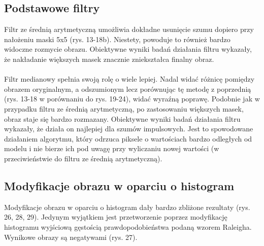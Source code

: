 \documentclass{classrep}
\begin{document}
\subsection{Podstawowe filtry}
Filtr ze średnią arytmetyczną umożliwia dokładne usunięcie szumu dopiero przy nałożeniu maski 5x5 (rys. 13-18b). Niestety, powoduje to również bardzo widoczne rozmycie obrazu. Obiektywne wyniki badań działania filtru wykazały, że nakładanie większych masek znacznie zniekształca finalny obraz. \\
\\
\indent
Filtr medianowy spełnia swoją rolę o wiele lepiej. Nadal widać różnicę pomiędzy obrazem oryginalnym, a odszumionym lecz porównując tę metodę z poprzednią (rys. 13-18 w porównaniu do rys. 19-24), widać wyraźną poprawę. Podobnie jak w przypadku filtru ze średnią arytmetyczną, po zastosowaniu większych masek, obraz staje się bardzo rozmazany. Obiektywne wyniki badań działania filtru wykazały, że działa on najlepiej dla szumów impulsowych. Jest to spowodowane działaniem algorytmu, który odrzuca piksele o wartościach bardzo odległych od modelu i nie bierze ich pod uwagę przy wyliczaniu nowej wartości (w przeciwieństwie do filtru ze średnią arytmetyczną).\\

\subsection{Modyfikacje obrazu w oparciu o histogram}
Modyfikacje obrazu w oparciu o histogram dały bardzo zbliżone rezultaty (rys. 26, 28, 29). Jedynym wyjątkiem jest przetworzenie poprzez modyfikację histogramu wyjściową gęstością prawdopodobieństwa podaną wzorem Raleigha. Wynikowe obrazy są negatywami (rys. 27).
\end{document}
